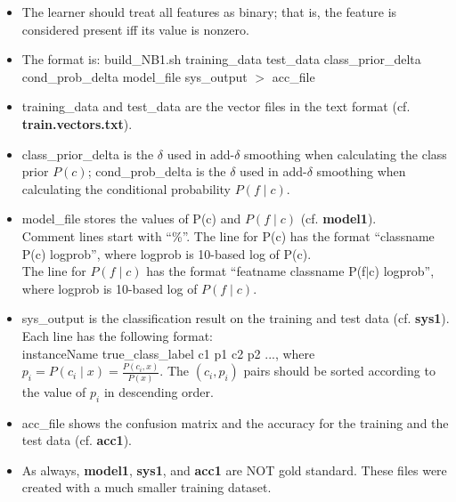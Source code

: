 \documentclass[11pt]{article}
\begin{document}
\begin{itemize} 
  \item The learner should treat all features as binary; that is,
        the feature is considered present iff its value is nonzero.

  \item The format is: build\_NB1.sh training\_data test\_data  class\_prior\_delta cond\_prob\_delta model\_file sys\_output $>$ acc\_file 

  \item training\_data and test\_data are the vector files in the text format
        (cf. {\bf train.vectors.txt}).

  \item class\_prior\_delta is the $\delta$ used in add-$\delta$ smoothing 
         when calculating the class prior $P(c)$; 
         cond\_prob\_delta is the $\delta$ used in add-$\delta$ smoothing 
         when calculating the
         conditional probability $P(f \mid c)$.

  \item model\_file stores the values of 
        P(c) and $P(f \mid c)$ (cf. {\bf model1}). \\
        Comment lines start with ``\%''.
        The line for P(c) has the format 
        ``classname P(c) logprob'', where logprob is 10-based log of P(c). \\
        The line for $P(f \mid c)$ has the format 
        ``featname classname P(f$\mid$c) logprob'', 
         where logprob is 10-based log of $P(f \mid c)$. 
        
  \item sys\_output is the classification result on the training and
        test data (cf. {\bf sys1}). Each line has the following format:\\
          instanceName true\_class\_label c1 p1 c2 p2 ...,
        where $p_i=P(c_i \mid x)=\frac{P(c_i, x)}{P(x)}$.
        The $(c_i, p_i)$ pairs should be sorted according to 
        the value of $p_i$ in descending order. 

  \item acc\_file shows the confusion matrix and the accuracy for
       the training and the test data (cf. {\bf acc1}). 

  \item As always, {\bf model1}, {\bf sys1}, and {\bf acc1}
        are NOT gold standard.
        These files were created with a much smaller training dataset.
\end{itemize}
\end{document}
